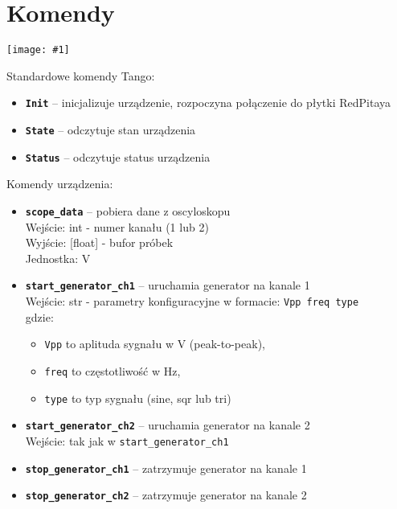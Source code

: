 \documentclass[12pt,a4paper]{article}
\newcommand{\screenshot}[1]{\begin{minipage}[c]{\textwidth}\texttt{[image: \#1]}\end{minipage}}
\begin{document}
	\section{Komendy}
	\screenshot{screenshots/commands.png}
	Standardowe komendy Tango:
	\begin{itemize}
		\item \textbf{\texttt{Init}} -- inicjalizuje urządzenie, rozpoczyna połączenie do płytki RedPitaya
		\item \textbf{\texttt{State}} -- odczytuje stan urządzenia
		\item \textbf{\texttt{Status}} -- odczytuje status urządzenia
	\end{itemize}
	Komendy urządzenia:
	\begin{itemize}
		\item \textbf{\texttt{scope\_data}} -- pobiera dane z oscyloskopu\\
			  Wejście: int - numer kanału (1 lub 2)\\
			  Wyjście: [float] - bufor próbek\\
			  Jednostka: V\\
		\item \textbf{\texttt{start\_generator\_ch1}} -- uruchamia generator na kanale 1\\
			  Wejście: str - parametry konfiguracyjne w formacie: \texttt{Vpp freq type}\\
			  gdzie:
			  \begin{itemize}
			  	\item \texttt{Vpp} to aplituda sygnału w V (peak-to-peak),
			  	\item \texttt{freq} to częstotliwość w Hz,
			  	\item \texttt{type} to typ sygnału (sine, sqr lub tri)
			  \end{itemize}
		\item \textbf{\texttt{start\_generator\_ch2}} -- uruchamia generator na kanale 2\\
			  Wejście: tak jak w \texttt{start\_generator\_ch1}
		\item \textbf{\texttt{stop\_generator\_ch1}} -- zatrzymuje generator na kanale 1
		\item \textbf{\texttt{stop\_generator\_ch2}} -- zatrzymuje generator na kanale 2
	\end{itemize}
\end{document}
